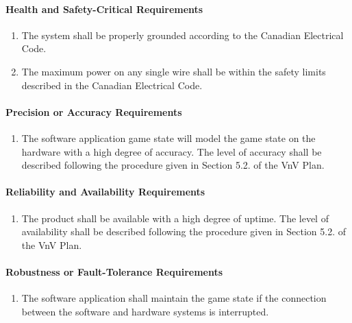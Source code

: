 \documentclass[12pt]{article}
\begin{document}
\paragraph{Health and Safety-Critical Requirements}
\begin{enumerate}[{PR}1., leftmargin=2\parindent, resume]
    \item The system shall be properly grounded according to the Canadian Electrical Code. \cite{CanadianElectricalCode2021}
    \item The maximum power on any single wire shall be within the safety limits described in the Canadian Electrical Code.
\end{enumerate}

\paragraph{Precision or Accuracy Requirements}
\begin{enumerate}[{PR}1., leftmargin=2\parindent, resume]
    \item The software application game state will model the game state on the \progname{} hardware with a high degree of accuracy. 
    The level of accuracy shall be described following the procedure given in Section 5.2.\thevnvSectionNfr{}
    of the VnV Plan.
        
\end{enumerate}

\paragraph{Reliability and Availability Requirements}
\begin{enumerate}[{PR}1., leftmargin=2\parindent, resume]
    \item The product shall be available with a high degree of uptime. The level of availability shall be described following the procedure 
    given in Section 5.2.\thevnvSectionNfr{} of the VnV Plan.
\end{enumerate}

\paragraph{Robustness or Fault-Tolerance Requirements}
\begin{enumerate}[{PR}1., leftmargin=2\parindent, resume]
    \item The software application shall maintain the game state if the connection between the software and hardware systems is interrupted.
\end{enumerate}
\end{document}
